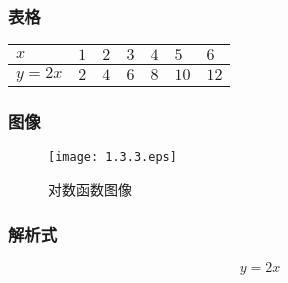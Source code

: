 \subsubsection{表格}
\begin{table}[H]
    \begin{center}
        \begin{tabular}{|l|l|l|l|l|l|l|}
            \hline
            $x$    & $ 1$ & $2$ & $3$ & $4$ & $5$  & $6$  \\ \hline
            $y=2x$ & $2$  & $4$ & $6$ & $8$ & $10$ & $12$ \\ \hline
        \end{tabular}
    \end{center}
\end{table}
\subsubsection{图像}
\begin{figure}[H]
    \centering \texttt{[image: 1.3.3.eps]} \caption{对数函数图像}
\end{figure}
\subsubsection{解析式}
$$
    \boxed{y=2x}
$$